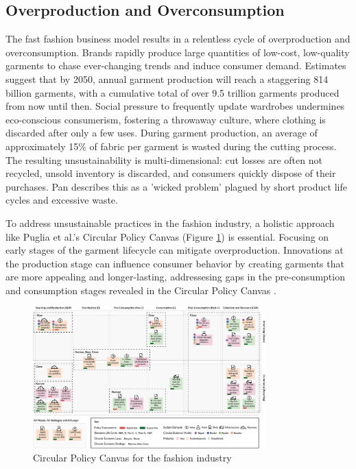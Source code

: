 \subsection{Overproduction and Overconsumption}
The fast fashion business model results in a relentless cycle of overproduction and overconsumption. Brands rapidly produce large quantities of low-cost, low-quality garments to chase ever-changing trends and induce consumer demand. Estimates suggest that by 2050, annual garment production will reach a staggering 814 billion garments, with a cumulative total of over 9.5 trillion garments produced from now until then. Social pressure to frequently update wardrobes undermines eco-conscious consumerism, fostering a throwaway culture, where clothing is discarded after only a few uses. During garment production, an average of approximately 15\% of fabric per garment is wasted during the cutting process. The resulting unsustainability is multi-dimensional: cut losses are often not recycled, unsold inventory is discarded, and consumers quickly dispose of their purchases. Pan describes this as a 'wicked problem' plagued by short product life cycles and excessive waste.

\vspace{\baselineskip}
To address unsustainable practices in the fashion industry, a holistic approach like Puglia et al.'s Circular Policy Canvas (Figure \ref{fig:circular_policy_canvas}) is essential. Focusing on early stages of the garment lifecycle can mitigate overproduction. Innovations at the production stage can influence consumer behavior by creating garments that are more appealing and longer-lasting, addressesing gaps in the pre-consumption and consumption stages revealed in the Circular Policy Canvas \cite{puglia_circular_2024}.
\begin{figure} [H]
    \centering
    \includegraphics[width=0.8\textwidth]{Images/circular policy canvas.png}
    \caption{Circular Policy Canvas for the fashion industry \cite{puglia_circular_2024}}
    \label{fig:circular_policy_canvas}
\end{figure}

